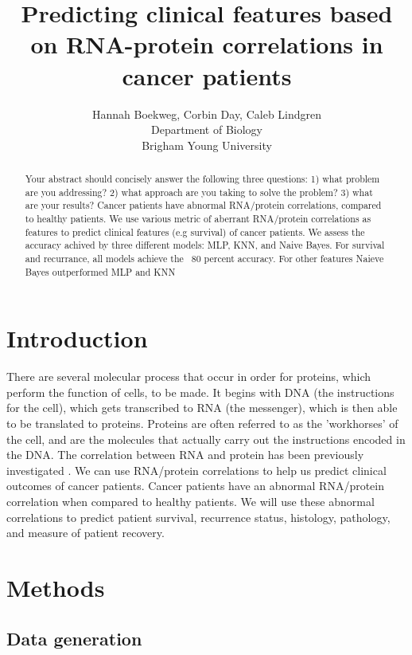 \documentclass{article}
\title{Predicting clinical features based on RNA-protein correlations in cancer patients}
\author{Hannah Boekweg, Corbin Day, Caleb Lindgren \\
Department of Biology\\
Brigham Young University}
\begin{document}
\maketitle

\begin{abstract}
  Your abstract should concisely answer the following three questions: 1) what problem are you addressing? 2) what approach are you taking to solve the problem? 3) what are your results?
  Cancer patients have abnormal RNA/protein correlations, compared to healthy patients.
  We use various metric of aberrant RNA/protein correlations as features to predict clinical features (e.g survival) of cancer patients.
  We assess the accuracy achived by three different models: MLP, KNN, and Naive Bayes. For survival and recurrance, all models achieve the ~80 percent accuracy. For other features Naieve Bayes outperformed MLP and KNN

\end{abstract}

\section{Introduction}
There are several molecular process that occur in order for proteins, which perform the function of cells, to be made. 
It begins with DNA (the instructions for the cell), which gets transcribed to RNA (the messenger), which is then able to be translated to proteins. 
Proteins are often referred to as the 'workhorses' of the cell, and are the molecules that actually carry out the instructions encoded in the DNA.
The correlation between RNA and protein has been previously investigated \cite{waldbauer_transcriptome_2012} \cite{payne_utility_2015} \cite{han_transcriptome_2021}.
We can use RNA/protein correlations to help us predict clinical outcomes of cancer patients. Cancer patients have an abnormal RNA/protein correlation when compared to healthy patients. 
We will use these abnormal correlations to predict patient survival, recurrence status, histology, pathology, and measure of patient recovery. 

\section{Methods}

\subsection{Data generation}
\end{document}
